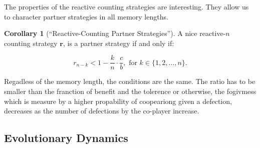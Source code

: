 \documentclass{article}
\theoremstyle{definition}
\newtheorem{corollary}{Corollary}[theorem]
\begin{document}
The properties of the reactive counting strategies are interesting. They allow
us to character partner strategies in all memory lengths.

\begin{corollary}[``Reactive-Counting Partner Strategies'']\label{corollary:reactive_counting_partner_strategies}
A nice reactive-$n$ counting strategy $\mathbf{r}$,
is a partner strategy if and only if:

\begin{equation}
  r_{n - k} < 1 - \frac{k}{n} \cdot \frac{c}{b}, \text{ for } k \in \{1, 2, \dots, n\}.
\end{equation}
\end{corollary}

Regadless of the memory length, the conditions are the same. The ratio has to be
smaller than the franction of benefit and the tolerence or otherwise, the
fogivmess which is measure by a higher propability of coopeariong given a
defection, decreases as the number of defections by the co-player increase. 


\subsection{Evolutionary Dynamics}
\end{document}
